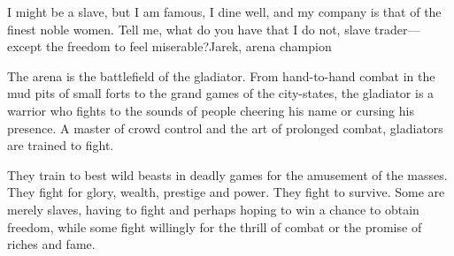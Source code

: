 {I might be a slave, but I am famous, I dine well, and my company is that of the finest noble women. Tell me, what do you have that I do not, slave trader---except the freedom to feel miserable?}{Jarek, arena champion}

The arena is the battlefield of the gladiator. From hand-to-hand combat in the mud pits of small forts to the grand games of the city-states, the gladiator is a warrior who fights to the sounds of people cheering his name or cursing his presence. A master of crowd control and the art of prolonged combat, gladiators are trained to fight.

They train to best wild beasts in deadly games for the amusement of the masses. They fight for glory, wealth, prestige and power. They fight to survive. Some are merely slaves, having to fight and perhaps hoping to win a chance to obtain freedom, while some fight willingly for the thrill of combat or the promise of riches and fame.

